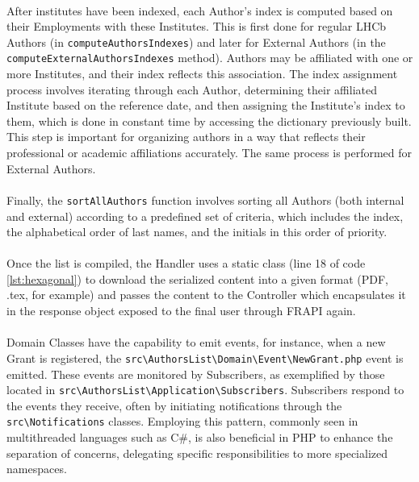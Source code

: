 \paragraph{} After institutes have been indexed, each Author's index is computed based on their Employments with these Institutes. This is first done for regular LHCb Authors (in \verb|computeAuthorsIndexes|) and later for External Authors (in the \texttt{compute\-External\-Authors\-Indexes} method). Authors may be affiliated with one or more Institutes, and their index reflects this association. The index assignment process involves iterating through each Author, determining their affiliated Institute based on the reference date, and then assigning the Institute's index to them, which is done in constant time by accessing the dictionary previously built. This step is important for organizing authors in a way that reflects their professional or academic affiliations accurately. The same process is performed for External Authors.

\paragraph{} Finally, the \verb|sortAllAuthors| function involves sorting all Authors (both internal and external) according to a predefined set of criteria, which includes the index, the alphabetical order of last names, and the initials in this order of priority. 

\paragraph{} Once the list is compiled, the Handler uses a static class (line 18 of code \ref{lst:hexagonal}) to download the serialized content into a given format (PDF, .tex, for example) and passes the content to the Controller which encapsulates it in the response object exposed to the final user through FRAPI again.

\paragraph{} Domain Classes have the capability to emit events, for instance, when a new Grant is registered, the \verb|src\AuthorsList\Domain\Event\NewGrant.php| event is emitted. These events are monitored by Subscribers, as exemplified by those located in \verb|src\AuthorsList\Application\Subscribers|. Subscribers respond to the events they receive, often by initiating notifications through the \verb|src\Notifications| classes. Employing this pattern, commonly seen in multithreaded languages such as C\#, is also beneficial in PHP to enhance the separation of concerns, delegating specific responsibilities to more specialized namespaces.

